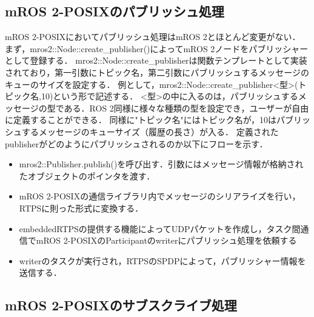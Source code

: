 \subsection{mROS 2-POSIXのパブリッシュ処理}
mROS 2-POSIXにおいてパブリッシュ処理はmROS 2とほとんど変更がない．
まず，mros2::Node::create_publisher()によってmROS 2ノードをパブリッシャーとして登録する．
mros2::Node::create\_publisherは関数テンプレートとして実装されており，第一引数にトピック名，第二引数にパブリッシュするメッセージのキューのサイズを設定する．
例として，mros2::Node::create\_publisher<型>(トピック名,10)という形で記述する．
<型>の中に入るのは，パブリッシュするメッセージの型である．ROS 2同様に様々な種類の型を設定でき，ユーザーが自由に定義することができる．
同様に"トピック名"にはトピック名が，10はパブリッシュするメッセージのキューサイズ（履歴の長さ）が入る．
定義されたpublisherがどのようにパブリッシュされるのか以下にフローを示す．
\begin{itemize}
    \item mros2::Publisher.publish()を呼び出す．引数にはメッセージ情報が格納されたオブジェクトのポインタを渡す．
    \item mROS 2-POSIXの通信ライブラリ内でメッセージのシリアライズを行い，RTPSに則った形式に変換する．
    \item embeddedRTPSの提供する機能によってUDPパケットを作成し，タスク間通信でmROS 2-POSIXのParticipantのwriterにパブリッシュ処理を依頼する
    \item writerのタスクが実行され，RTPSのSPDPによって，パブリッシャー情報を送信する．
\end{itemize}
\subsection{mROS 2-POSIXのサブスクライブ処理}


